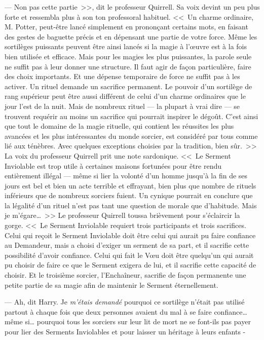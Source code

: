 --- Non pas cette partie~>>, dit le professeur Quirrell. Sa voix devint un peu plus forte et ressembla plus à son ton professoral habituel. <<~Un charme ordinaire, M. Potter, peut-être lancé simplement en prononçant certains mots, en faisant des gestes de baguette précis et en dépensant une partie de votre force. Même les sortilèges puissants peuvent être ainsi lancés si la magie à l'œuvre est à la fois bien utilisée et efficace. Mais pour les magies les plus puissantes, la parole seule ne suffit pas à leur donner une structure. Il faut agir de façon particulière, faire des choix importants. Et une dépense temporaire de force ne suffit pas à les activer. Un rituel demande un sacrifice permanent. Le pouvoir d'un sortilège de rang supérieur peut être aussi différent de celui d'un charme ordinaires que le jour l'est de la nuit. Mais de nombreux rituel — la plupart à vrai dire — se trouvent requérir au moins un sacrifice qui pourrait inspirer le dégoût. C'est ainsi que tout le domaine de la magie rituelle, qui contient les réussites les plus avancées et les plus intéressantes du monde sorcier, est considéré par tous comme lié aux ténèbres. Avec quelques exceptions choisies par la tradition, bien sûr.~>> La voix du professeur Quirrell prit une note sardonique. <<~Le Serment Inviolable est trop utile à certaines maisons fortunées pour être rendu entièrement illégal — même si lier la volonté d'un homme jusqu'à la fin de ses jours est bel et bien un acte terrible et effrayant, bien plus que nombre de rituels inférieurs que de nombreux sorciers fuient. Un cynique pourrait en conclure que la légalité d'un rituel n'est pas tant une question de morale que d'habitude. Mais je m'égare…~>> Le professeur Quirrell toussa brièvement pour s'éclaircir la gorge. <<~Le Serment Inviolable requiert trois participants et trois sacrifices. Celui qui reçoit le Serment Inviolable doit être celui qui aurait pu faire confiance au Demandeur, mais a choisi d'exiger un serment de sa part, et il sacrifie cette possibilité d'avoir confiance. Celui qui fait le Vœu doit être quelqu'un qui aurait pu choisir de faire ce que le Serment exigera de lui, et il sacrifie cette capacité de choisir. Et le troisième sorcier, l'Enchaîneur, sacrifie de façon permanente une petite partie de sa magie afin de maintenir le Serment éternellement.

--- Ah, dit Harry. Je \emph{m'étais demandé} pourquoi ce sortilège n'était pas utilisé partout à chaque fois que deux personnes avaient du mal à se faire confiance… même si… pourquoi tous les sorciers sur leur lit de mort ne se font-ils pas payer pour lier des Serments Inviolables et pour laisser un héritage à leurs enfants -

